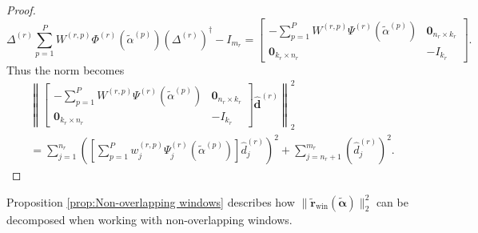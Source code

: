 \documentclass[12pt]{article}
\newcommand{\dVec}{\mathbf{d}}	%
\newcommand{\rVec}{\mathbf{r}}	%
\newcommand{\pinv}[1]{{#1}^\dagger}	%
\newcommand{\regparam}{\alpha}  %
\newcommand{\regparamVec}{\bm{\regparam}}   %
\newcommand{\regparamBig}{\widetilde{\regparam}}   %
\newcommand{\regparamVecBig}{\widetilde{\regparamVec}}   %
\newcommand{\rBig}{\widetilde{\rVec}}	%
\newcommand{\rWinBig}{\rBig_{\text{win}}}	%
\newcommand{\zeroVec}{\bm{0}}	%
\newcommand{\svd}[1]{\widehat{#1}}	%
\begin{document}
\begin{proof}
\[\Delta^{(r)}\sum_{p=1}^{P} W^{(r,p)}\Phi^{(r)}\left(\widetilde{\regparam}^{(p)}\right)\pinv{\left(\Delta^{(r)}\right)} - I_{m_r} = \begin{bmatrix}
-\sum_{p=1}^{P} W^{(r,p)} \Psi^{(r)}\left(\widetilde{\regparam}^{(p)}\right) & \zeroVec_{n_r \times k_r} \\
\zeroVec_{k_r \times n_r} & -I_{k_r}
\end{bmatrix}.\]
Thus the norm becomes
\begin{align*}
    &\left\|\begin{bmatrix}
-\sum_{p=1}^{P} W^{(r,p)} \Psi^{(r)}\left(\widetilde{\regparam}^{(p)}\right) & \zeroVec_{n_r \times k_r} \\
\zeroVec_{k_r \times n_r} & -I_{k_r}
\end{bmatrix}\svd{\dVec}^{(r)}\right\|_2^2 \\
&= \sum_{j=1}^{n_r} \left(\left[\sum_{p=1}^{P} w_{j}^{(r,p)}\Psi_{j}^{(r)}\left(\regparamBig^{(p)}\right)\right] \hat{d}_j^{(r)}\right)^2 + \sum_{j ={n_r}+1}^{m_r} \left(\hat{d}_j^{(r)}\right)^2.
\end{align*}
\end{proof}

Proposition \ref{prop:Non-overlapping windows} describes how $\|\rWinBig(\regparamVecBig)\|_2^2$ can be decomposed when working with non-overlapping windows.
\end{document}
